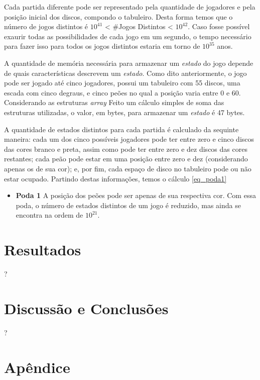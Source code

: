 Cada partida diferente pode ser representado pela quantidade de
jogadores e pela posição inicial dos discos, compondo o tabuleiro. Desta
forma temos que o número de jogos distintos é $10^{41}$ \textless{}
\#Jogos Distintos \textless{} $10^{42}$. Caso fosse possível exaurir
todas as possibilidades de cada jogo em um segundo, o tempo necessário
para fazer isso para todos os jogos distintos estaria em torno de
$10^{35}$ anos.

A quantidade de memória necessária para armazenar um \emph{estado} do
jogo depende de quais características descrevem um \emph{estado}. Como
dito anteriormente, o jogo pode ser jogado até cinco jogadores, possui
um tabuleiro com 55 discos, uma escada com cinco degraus, e cinco peões
no qual a posição varia entre 0 e 60. Considerando as estruturas
\emph{array} Feito um cálculo simples de soma das estruturas utilizadas,
o valor, em bytes, para armazenar um \emph{estado} é 47 bytes.

A quantidade de estados distintos para cada partida é calculado da
sequinte maneira: cada um dos cinco possíveis jogadores pode ter entre
zero e cinco discos das cores branco e preta, assim como pode ter entre
zero e dez discos das cores restantes; cada peão pode estar em uma
posição entre zero e dez (considerando apenas os de sua cor); e, por
fim, cada espaço de disco no tabuleiro pode ou não estar ocupado.
Partindo destas informações, temos o cálculo \ref{eq_poda1}

\begin{itemize}
\itemsep1pt\parskip0pt
\item
  \textbf{Poda 1} A posição dos peões pode ser apenas de sua respectiva
  cor. Com essa poda, o número de estados distintos de um jogo é
  reduzido, mas ainda se encontra na ordem de $10^{21}$.
\end{itemize}

\section{Resultados}\label{resultados}

?

\section{Discussão e Conclusões}\label{discussuxe3o-e-conclusuxf5es}

?

\section{Apêndice}\label{apuxeandice}

